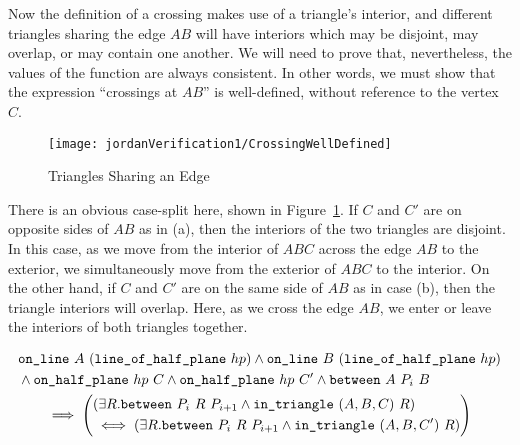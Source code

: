 Now the definition of a crossing makes use of a triangle's interior, and different triangles sharing the edge $AB$ will have interiors which may be disjoint, may overlap, or may contain one another. We will need to prove that, nevertheless, the values of the function  are always consistent. In other words, we must show that the expression ``crossings at $AB$'' is well-defined, without reference to the vertex $C$.

\begin{figure}
\centering\texttt{[image: jordanVerification1/CrossingWellDefined]}
\caption{Triangles Sharing an Edge}
\label{fig:CrossingWellDefined}
\end{figure}

There is an obvious case-split here, shown in Figure~\ref{fig:CrossingWellDefined}. If $C$ and $C'$ are on opposite sides of $AB$ as in (a), then the interiors of the two triangles are disjoint. In this case, as we move from the interior of $ABC$ across the edge $AB$ to the exterior, we simultaneously move from the exterior of $ABC$ to the interior. On the other hand, if $C$ and $C'$ are on the same side of $AB$ as in case (b), then the triangle interiors will overlap. Here, as we cross the edge $AB$, we enter or leave the interiors of both triangles together. 

\begin{multline}\label{eq:crossChangeLemma1}
  \begin{split}
    &\texttt{on\_line}\ A\ (\texttt{line\_of\_half\_plane}\ hp) \wedge \texttt{on\_line}\ B\ (\texttt{line\_of\_half\_plane}\ hp)\\
    &\wedge\texttt{on\_half\_plane}\ hp\ C \wedge \texttt{on\_half\_plane}\ hp\ C'\wedge\texttt{between}\ A\ P_i\ B
  \end{split}\\
  \implies\left(\begin{split} 
      &(\exists R. \texttt{between}\ P_i\ R\ P_{i+1} \wedge \texttt{in\_triangle}\ (A,B,C)\ R)\\
      & \iff (\exists R. \texttt{between}\ P_i\ R\ P_{i+1} \wedge \texttt{in\_triangle}\ (A,B,C')\ R)
  \end{split}\right)
\end{multline}

